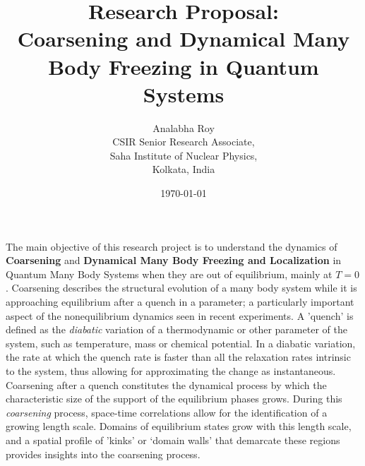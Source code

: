 \documentclass[a4paper,9pt]{article}
\title{Research Proposal:\\ Coarsening and Dynamical Many Body Freezing in Quantum Systems}
\author{Analabha Roy\\CSIR Senior Research Associate,\\ Saha Institute of Nuclear Physics,\\ Kolkata, India}
\date{\today}
\begin{document}
 \maketitle

The main objective of this research project is to understand the dynamics of \textbf{Coarsening} and \textbf{Dynamical Many Body Freezing and Localization} in  {Quantum} Many Body {Systems} when they are out of equilibrium, mainly at $T=0$. Coarsening describes the structural evolution of a many body system while it is approaching equilibrium after a quench in a  {parameter}; a particularly important aspect of the nonequilibrium dynamics seen in recent experiments. A 'quench' is defined as the \textit{diabatic} variation of a thermodynamic or other  {parameter} of the system, such as temperature, mass or chemical potential. In a diabatic variation, the rate at which the quench rate is faster than all the relaxation rates intrinsic to the system, thus allowing for approximating the change as instantaneous. Coarsening after a quench constitutes the dynamical process by which the characteristic  {size} of the support of the equilibrium phases grows. 
During this \textit{coarsening} process, space-time correlations allow for the identification of a growing length scale. Domains of equilibrium states grow with this length scale, and a spatial profile of 'kinks' or  {`domain walls'} that demarcate these regions provides insights into the coarsening process.
\end{document}
